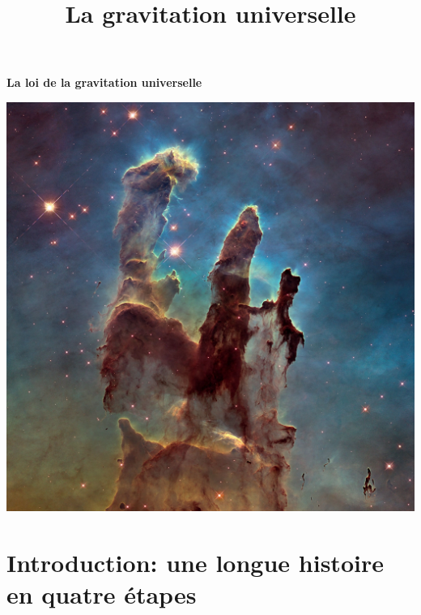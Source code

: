 \documentclass[
  letterpaper,
  DIV=11,
  numbers=noendperiod]{scrartcl}
\title{La gravitation universelle}
\author{}
\date{}
\theoremstyle{definition}
\theoremstyle{definition}
\theoremstyle{definition}
\theoremstyle{remark}
\begin{document}
\maketitle


\begin{titlepage}
    \centering
    
    \vspace*{2cm} 
    
    {\fontsize{24pt}{28pt}\selectfont\textbf{La loi de la gravitation universelle}\par}
    
    \vspace*{1cm} 
    
    \includegraphics[width=\textwidth]{./figures/grav/nebula.png} %
    

    
    \vfill
    
\end{titlepage}

\section{Introduction: une longue histoire en quatre
étapes}\label{introduction-une-longue-histoire-en-quatre-uxe9tapes}
\end{document}
